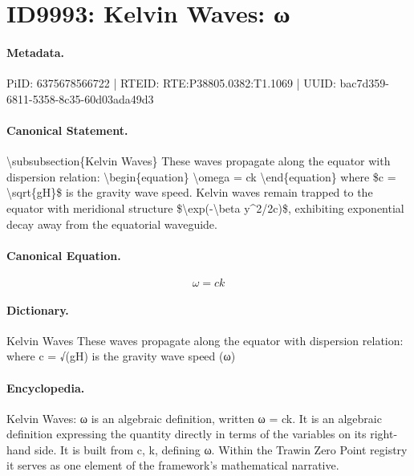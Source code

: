 \section*{ID9993: Kelvin Waves: ω}
\paragraph{Metadata.}
PiID: 6375678566722 | RTEID: RTE:P38805.0382:T1.1069 | UUID: bac7d359-6811-5358-8c35-60d03ada49d3

\paragraph{Canonical Statement.}
\textbackslash{}subsubsection\{Kelvin Waves\} These waves propagate along the equator with dispersion relation: \textbackslash{}begin\{equation\} \textbackslash{}omega = ck \textbackslash{}end\{equation\} where \$c = \textbackslash{}sqrt\{gH\}\$ is the gravity wave speed. Kelvin waves remain trapped to the equator with meridional structure \$\textbackslash{}exp(-\textbackslash{}beta y\textasciicircum{}2/2c)\$, exhibiting exponential decay away from the equatorial waveguide.

\paragraph{Canonical Equation.}
\[
\omega = ck
\]

\paragraph{Dictionary.}
Kelvin Waves These waves propagate along the equator with dispersion relation: where c = √(gH) is the gravity wave speed (ω)

\paragraph{Encyclopedia.}
Kelvin Waves: ω is an algebraic definition, written ω = ck. It is an algebraic definition expressing the quantity directly in terms of the variables on its right-hand side. It is built from c, k, defining ω. Within the Trawin Zero Point registry it serves as one element of the framework's mathematical narrative.
